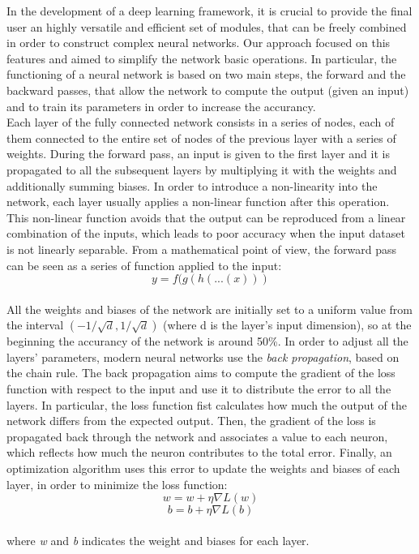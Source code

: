\documentclass[10pt,conference,compsocconf]{IEEEtran}
\begin{document}
   In the development of a deep learning framework, it is crucial to provide the final user an highly versatile and efficient set of modules, that can be freely combined in order to construct complex neural networks. Our approach focused on this features and aimed to simplify the network basic operations. In particular, the functioning of a neural network is based on two main steps, the forward and the backward passes, that allow the network to compute the output (given an input) and to train its parameters in order to increase the accurancy.\\
   Each layer of the fully connected network consists in a series of nodes, each of them connected to the entire set of nodes of the previous layer with a series of weights. During the forward pass, an input is given to the first layer and it is propagated to all the subsequent layers by multiplying it with the weights and additionally summing biases. In order to introduce a non-linearity into the network, each layer usually applies a non-linear function after this operation. This non-linear function avoids that the output can be reproduced from a linear combination of the inputs, which leads to poor accuracy when the input dataset is not linearly separable. From a mathematical point of view, the forward pass can be seen as a series of function applied to the input:\\
   \[y = f(g(h(...(x)))\]\\
   All the weights and biases of the network are initially set to a uniform value from the interval $(-1/\sqrt{d}, 1/\sqrt{d}) $ (where d is the layer's input dimension), so at the beginning the accurancy of the network is around 50\%. In order to adjust all the layers' parameters, modern neural networks use the \textit{back propagation}, based on the chain rule. The back propagation aims to compute the gradient of the loss function with respect to the input and use it to distribute the error to all the layers. In particular, the loss function fist calculates how much the output of the network differs from the expected output. Then, the gradient of the loss is propagated back through the network and associates a value to each neuron, which reflects how much the neuron contributes to the total error. Finally, an optimization algorithm uses this error to update the weights and biases of each layer, in order to minimize the loss function:\\
    \[w = w + \eta\nabla L(w)\]
    \[b = b + \eta\nabla L(b)\]\\
   where \textit{w} and \textit{b} indicates the weight and biases for each layer.
\end{document}
